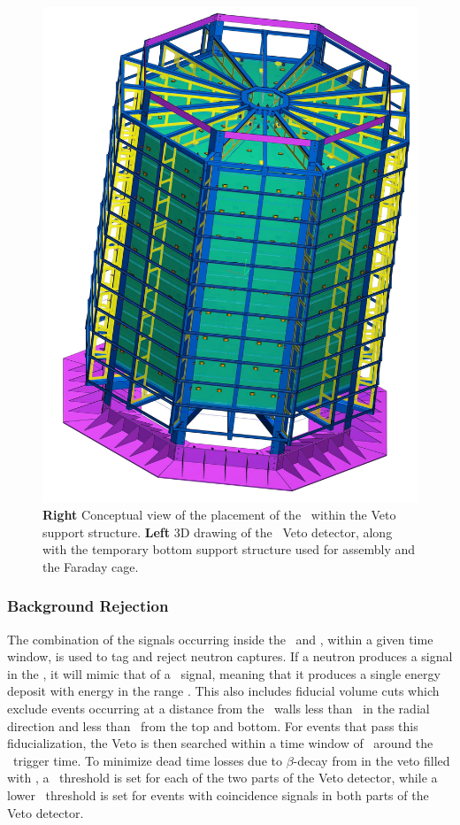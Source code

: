 \begin{figure}[!t]
\includegraphics[height=0.4\textheight]{./Figures/Veto-Faraday_new.jpg}
\caption[3D drawings of the \DSks\ Veto detector.]{{\bf Right} Conceptual view of the placement of the \TPC\ within the Veto support structure. {\bf Left} 3D drawing of the \DSks\ Veto detector, along with the temporary bottom support structure used for assembly and the Faraday cage.}
\label{fig:VetoAssembly}
\end{figure}

\subsubsection{Background Rejection}

The combination of the signals occurring inside the \IAB\ and \OAB, within a given time window, is used to tag and reject neutron captures.  If a neutron produces a signal in the \TPC, it will mimic that of a \WIMP\ signal, meaning that it produces a single energy deposit with energy in the range \DSkROIEnergyRange.  This also includes fiducial volume cuts which exclude events occurring at a distance from the \TPC\ walls less than \DSkVetoFVTPCcut\ in the radial direction and less than \DSkVetoFVTPCcutz\ from the top and bottom.  For events that pass this fiducialization, the Veto is then searched within a time window of  \DSkVetoTimeCut\ around the \TPC\ trigger time. To minimize dead time losses due to $\beta$-decay from  in the veto filled with \AAr,  a \ABSingleThreshold\ threshold is set for each of the two parts of the Veto detector, while a lower \ABCoincidenceThreshold\ threshold is set for events with coincidence signals in both parts of the Veto detector.

